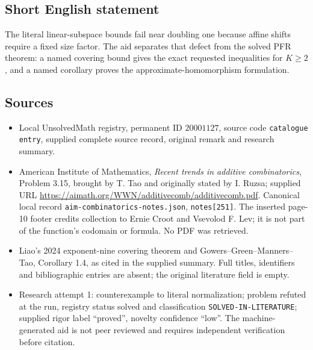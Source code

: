 \documentclass[11pt]{article}
\begin{document}
\subsection{Short English statement}
The literal linear-subspace bounds fail near doubling one because affine shifts require a fixed size factor. The aid separates that defect from the solved PFR theorem: a named covering bound gives the exact requested inequalities for $K\geq2$, and a named corollary proves the approximate-homomorphism formulation.
\subsection{Sources}
\begin{itemize}
\item Local UnsolvedMath registry, permanent ID $20001127$, source code \texttt{catalogue entry}, supplied complete source record, original remark and research summary.
\item American Institute of Mathematics, \emph{Recent trends in additive combinatorics}, Problem 3.15, brought by T. Tao and originally stated by I. Ruzsa; supplied URL \url{https://aimath.org/WWN/additivecomb/additivecomb.pdf}. Canonical local record \texttt{aim-combinatorics-notes.json}, \texttt{notes[251]}. The inserted page-10 footer credits collection to Ernie Croot and Vsevolod F. Lev; it is not part of the function's codomain or formula. No PDF was retrieved.
\item Liao's 2024 exponent-nine covering theorem and Gowers--Green--Manners--Tao, Corollary 1.4, as cited in the supplied summary. Full titles, identifiers and bibliographic entries are absent; the original literature field is empty.
\item Research attempt 1: counterexample to literal normalization; problem refuted at the run, registry status solved and classification \texttt{SOLVED-IN-LITERATURE}; supplied rigor label ``proved'', novelty confidence ``low''. The machine-generated aid is not peer reviewed and requires independent verification before citation.
\end{itemize}
\end{document}
